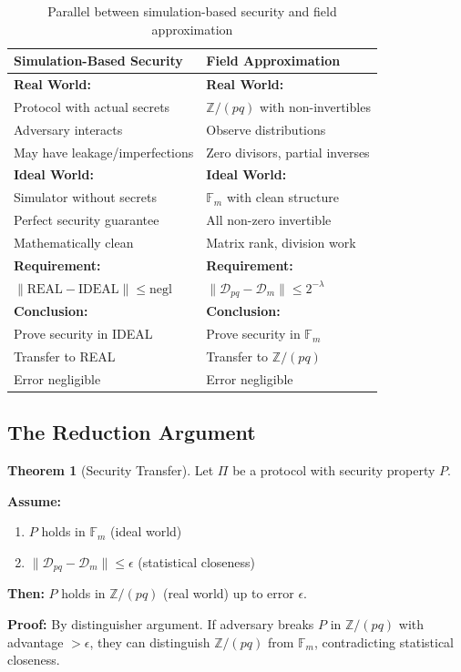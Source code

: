 \documentclass[11pt]{article}
\theoremstyle{definition}
\newtheorem{theorem}{Theorem}
\begin{document}
\begin{table}[h]
\centering
\begin{tabular}{@{}p{}p{}@{}}
\toprule
\textbf{Simulation-Based Security} & \textbf{Field Approximation} \\ 
\midrule
\textbf{Real World:} & \textbf{Real World:} \\
Protocol with actual secrets & $\mathbb{Z}/(pq)$ with non-invertibles \\
Adversary interacts & Observe distributions \\
May have leakage/imperfections & Zero divisors, partial inverses \\[0.5em]

\textbf{Ideal World:} & \textbf{Ideal World:} \\
Simulator without secrets & $\mathbb{F}_m$ with clean structure \\
Perfect security guarantee & All non-zero invertible \\
Mathematically clean & Matrix rank, division work \\[0.5em]

\textbf{Requirement:} & \textbf{Requirement:} \\
$\|\text{REAL} - \text{IDEAL}\| \leq \text{negl}$ & $\|\mathcal{D}_{pq} - \mathcal{D}_m\| \leq 2^{-\lambda}$ \\[0.5em]

\textbf{Conclusion:} & \textbf{Conclusion:} \\
Prove security in IDEAL & Prove security in $\mathbb{F}_m$ \\
Transfer to REAL & Transfer to $\mathbb{Z}/(pq)$ \\
Error negligible & Error negligible \\
\bottomrule
\end{tabular}
\caption{Parallel between simulation-based security and field approximation}
\end{table}

\subsection{The Reduction Argument}

\begin{theorem}[Security Transfer]
Let $\Pi$ be a protocol with security property $P$.

\textbf{Assume:}
\begin{enumerate}
\item $P$ holds in $\mathbb{F}_m$ (ideal world)
\item $\|\mathcal{D}_{pq} - \mathcal{D}_m\| \leq \epsilon$ (statistical closeness)
\end{enumerate}

\textbf{Then:}
$P$ holds in $\mathbb{Z}/(pq)$ (real world) up to error $\epsilon$.

\textbf{Proof:} By distinguisher argument. If adversary breaks $P$ in $\mathbb{Z}/(pq)$ 
with advantage $> \epsilon$, they can distinguish $\mathbb{Z}/(pq)$ from $\mathbb{F}_m$, 
contradicting statistical closeness.
\end{theorem}
\end{document}
